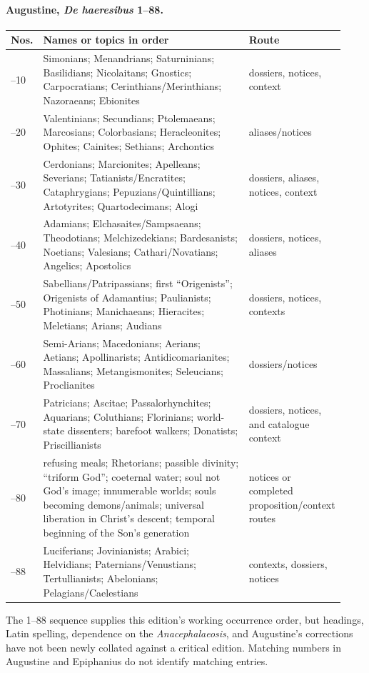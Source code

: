 \paragraph{Augustine, \emph{De haeresibus} 1--88.}
\begin{longtable}{@{}>{\raggedright\arraybackslash}p{0.09\linewidth}>{\raggedright\arraybackslash}p{0.68\linewidth}>{\raggedright\arraybackslash}p{0.16\linewidth}@{}}
\toprule
Nos. & Names or topics in order & Route\\
\midrule
1--10 & Simonians; Menandrians; Saturninians; Basilidians; Nicolaitans; Gnostics; Carpocratians; Cerinthians/Merinthians; Nazoraeans; Ebionites & dossiers, notices, context\\
11--20 & Valentinians; Secundians; Ptolemaeans; Marcosians; Colorbasians; Heracleonites; Ophites; Cainites; Sethians; Archontics & aliases/notices\\
21--30 & Cerdonians; Marcionites; Apelleans; Severians; Tatianists/Encratites; Cataphrygians; Pepuzians/Quintillians; Artotyrites; Quartodecimans; Alogi & dossiers, aliases, notices, context\\
31--40 & Adamians; Elchasaites/Sampsaeans; Theodotians; Melchizedekians; Bardesanists; Noetians; Valesians; Cathari/Novatians; Angelics; Apostolics & dossiers, notices, aliases\\
41--50 & Sabellians/Patripassians; first ``Origenists''; Origenists of Adamantius; Paulianists; Photinians; Manichaeans; Hieracites; Meletians; Arians; Audians & dossiers, notices, contexts\\
51--60 & Semi-Arians; Macedonians; Aerians; Aetians; Apollinarists; Antidicomarianites; Massalians; Metangismonites; Seleucians; Proclianites & dossiers/notices\\
61--70 & Patricians; Ascitae; Passalorhynchites; Aquarians; Coluthians; Florinians; world-state dissenters; barefoot walkers; Donatists; Priscillianists & dossiers, notices, and catalogue context\\
71--80 & refusing meals; Rhetorians; passible divinity; ``triform God''; coeternal water; soul not God's image; innumerable worlds; souls becoming demons/animals; universal liberation in Christ's descent; temporal beginning of the Son's generation & notices or completed proposition/context routes\\
81--88 & Luciferians; Jovinianists; Arabici; Helvidians; Paternians/Venustians; Tertullianists; Abelonians; Pelagians/Caelestians & contexts, dossiers, notices\\
\bottomrule
\end{longtable}
The 1--88 sequence supplies this edition's working occurrence order, but headings, Latin spelling, dependence on the \emph{Anacephalaeosis}, and Augustine's corrections have not been newly collated against a critical edition. Matching numbers in Augustine and Epiphanius do not identify matching entries.

